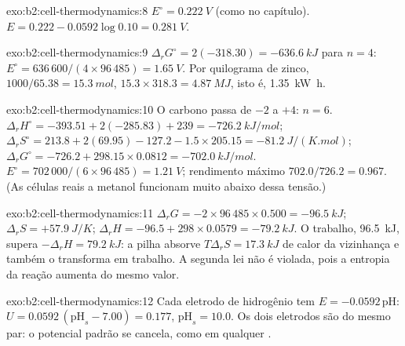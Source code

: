 \begin{solution}{exo:b2:cell-thermodynamics:8}
$E^\circ = \qty{0.222}{V}$ (como no capítulo). $E = 0.222 - 0.0592\log 0.10 =
\qty{0.281}{V}$.
\end{solution}

\begin{solution}{exo:b2:cell-thermodynamics:9}
$\Delta_r G^\circ = 2(-318.30) = \qty{-636.6}{kJ}$ para $n = 4$: $E^\circ =
636\,600/(4 \times 96\,485) = \qty{1.65}{V}$. Por quilograma de zinco, $1000/65.38 =
\qty{15.3}{mol}$, $15.3 \times 318.3 = \qty{4.87}{MJ}$, isto é, \qty{1.35}{kW.h}.
\end{solution}

\begin{solution}{exo:b2:cell-thermodynamics:10}
O carbono passa de $-2$ a $+4$: $n = 6$. $\Delta_r H^\circ = -393.51 + 2(-285.83) +
239 = \qty{-726.2}{kJ/mol}$; $\Delta_r S^\circ = 213.8 + 2(69.95) - 127.2 - 1.5
\times 205.15 = \qty{-81.2}{J/(K.mol)}$; $\Delta_r G^\circ = -726.2 + 298.15 \times
0.0812 = \qty{-702.0}{kJ/mol}$. $E^\circ = 702\,000/(6 \times 96\,485) =
\qty{1.21}{V}$; rendimento máximo $702.0/726.2 = 0.967$. (As células reais a
metanol funcionam muito abaixo dessa tensão.)
\end{solution}

\begin{solution}{exo:b2:cell-thermodynamics:11}
$\Delta_r G = -2 \times 96\,485 \times 0.500 = \qty{-96.5}{kJ}$; $\Delta_r S = +\qty{57.9}{J/K}$;
$\Delta_r H = -96.5 + 298 \times 0.0579 = \qty{-79.2}{kJ}$. O trabalho, \qty{96.5}{kJ},
supera $-\Delta_r H = \qty{79.2}{kJ}$: a pilha absorve $T\Delta_r S = \qty{17.3}{kJ}$
de calor da vizinhança e também o transforma em trabalho. A segunda lei não é
violada, pois a entropia da reação aumenta do mesmo valor.
\end{solution}

\begin{solution}{exo:b2:cell-thermodynamics:12}
Cada eletrodo de hidrogênio tem $E = -0.0592\,\mathrm{pH}$: $U = 0.0592\,(\mathrm{pH}_s -
7.00) = 0.177$, $\mathrm{pH}_s = 10.0$. Os dois eletrodos são do mesmo par: o
potencial padrão se cancela, como em qualquer .
\end{solution}

